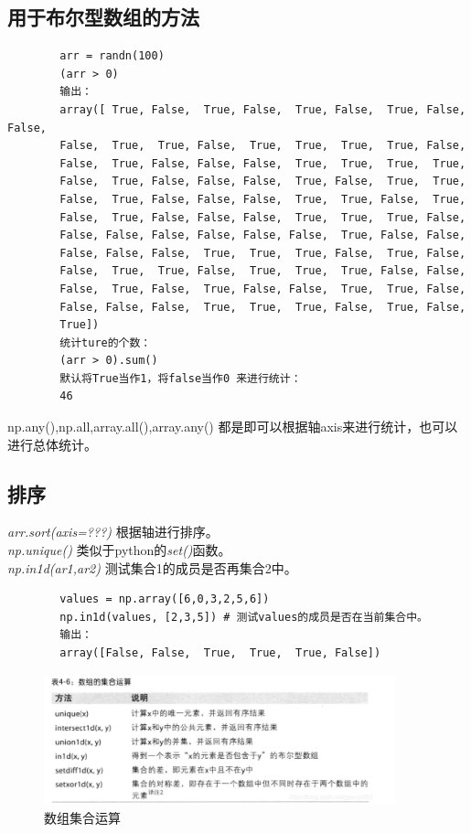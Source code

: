 \documentclass{article}
\begin{document}
	\subsection{用于布尔型数组的方法}
	\begin{lstlisting}
		arr = randn(100)
		(arr > 0)
		输出：
		array([ True, False,  True, False,  True, False,  True, False, False,
		False,  True,  True, False,  True,  True,  True,  True, False,
		False,  True, False, False, False,  True,  True,  True,  True,
		False,  True, False, False, False,  True, False,  True,  True,
		False,  True, False, False, False,  True,  True, False,  True,
		False,  True, False, False, False,  True,  True,  True, False,
		False, False, False, False, False, False,  True, False, False,
		False, False, False,  True,  True,  True, False,  True, False,
		False,  True,  True, False,  True,  True,  True, False, False,
		False,  True, False,  True, False, False,  True,  True, False,
		False, False, False,  True,  True,  True, False,  True, False,
		True])
		统计ture的个数：
		(arr > 0).sum()
		默认将True当作1，将false当作0 来进行统计：
		46
	\end{lstlisting}
	
	np.any(),np.all,array.all(),array.any() 都是即可以根据轴axis来进行统计，也可以进行总体统计。
	\subsection{排序}
	\emph{arr.sort(axis=???)} 根据轴进行排序。\\
	\emph{np.unique()} 类似于python的\emph{set()}函数。\\
	\emph{np.in1d(ar1,ar2)} 测试集合1的成员是否再集合2中。
	\begin{lstlisting}
		values = np.array([6,0,3,2,5,6])		
		np.in1d(values, [2,3,5]) # 测试values的成员是否在当前集合中。
		输出：
		array([False, False,  True,  True,  True, False])
	\end{lstlisting} 
	\begin{figure}[htbp]
		\centering
		\includegraphics[width=4in]{fig/np_5}
		\caption{数组集合运算}
		\label{fig-jiheyunsuan}
	\end{figure}
\end{document}
